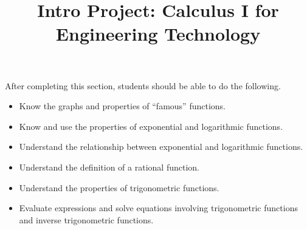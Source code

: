 \documentclass{ximera}
\title{Intro Project: Calculus I for Engineering Technology}
\begin{document}
\begin{abstract}
\end{abstract}

\maketitle

\begin{sectionOutcomes}
After completing this section, students should be able to do the following.

\begin{itemize}
	\item Know the graphs and properties of ``famous'' functions.
	\item Know and use the properties of exponential and logarithmic functions.
	\item Understand the relationship between exponential and logarithmic functions.
        \item Understand the definition of a rational function.
	\item Understand the properties of trigonometric functions.
	\item Evaluate expressions and solve equations involving
          trigonometric functions and inverse trigonometric functions.
\end{itemize}
\end{sectionOutcomes}
\end{document}
